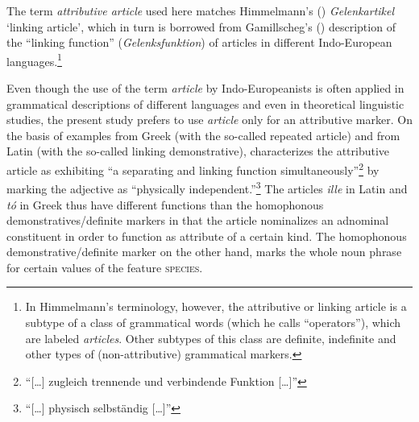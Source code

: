 The term \emph{attributive article} used here matches Himmelmann's (\citeyear{himmelmann1997}) \emph{Gelenkartikel} ‘linking article’, which in turn is borrowed from Gamillscheg's (\citeyear{gamillscheg1937}) description of the “linking function” (\emph{Gelenksfunktion}) of articles in different Indo-European languages.\footnote{In Himmelmann's \citeyear{himmelmann1997} terminology, however, the attributive or linking article is a subtype of a class of grammatical words (which he calls “operators”), which are labeled \emph{articles}. Other subtypes of this class are definite, indefinite and other types of (non-attributive) grammatical markers.} 

Even though the use of the term \emph{article} by Indo-Europeanists is often applied in grammatical descriptions of different languages and even in theoretical linguistic studies, the present study prefers to use \emph{article} only for an attributive marker. On the basis of examples from Greek (with the so-called repeated article) and from Latin (with the so-called linking demonstrative), \citet[48]{gamillscheg1937} characterizes the attributive article as exhibiting “a separating and linking function simultaneously”\footnote{“[\dots] zugleich trennende und verbindende Funktion [\dots]”} by marking the adjective as “physically independent.”\footnote{“[\dots] physisch selbständig [\dots]”} The articles \textit{ille} in Latin and \textit{tó} in Greek thus have different functions than the homophonous demonstratives\slash{}definite markers in that the article nominalizes an adnominal constituent in order to function as attribute of a certain kind. The homophonous demonstrative\slash{}definite marker on the other hand, marks the whole noun phrase for certain values of the feature \textsc{species}.

